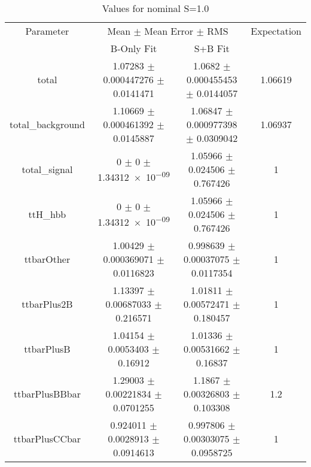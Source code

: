 \begin{table}
\centering
\caption{Values for nominal S=1.0}
\begin{tabular}{cccc}
\toprule
Parameter & \multicolumn{2}{c}{Mean $\pm$ Mean Error $\pm$ RMS} & Expectation\\
 & B-Only Fit & S+B Fit & \\
\midrule
total & \num{1.07283} $\pm$ \num{0.000447276} $\pm$ \num{0.0141471} & \num{1.0682} $\pm$ \num{0.000455453} $\pm$ \num{0.0144057} & \num{1.06619}\\
total\_background & \num{1.10669} $\pm$ \num{0.000461392} $\pm$ \num{0.0145887} & \num{1.06847} $\pm$ \num{0.000977398} $\pm$ \num{0.0309042} & \num{1.06937}\\
total\_signal & \num{0} $\pm$ \num{0} $\pm$ \num{1.34312e-09} & \num{1.05966} $\pm$ \num{0.024506} $\pm$ \num{0.767426} & \num{1}\\
ttH\_hbb & \num{0} $\pm$ \num{0} $\pm$ \num{1.34312e-09} & \num{1.05966} $\pm$ \num{0.024506} $\pm$ \num{0.767426} & \num{1}\\
ttbarOther & \num{1.00429} $\pm$ \num{0.000369071} $\pm$ \num{0.0116823} & \num{0.998639} $\pm$ \num{0.00037075} $\pm$ \num{0.0117354} & \num{1}\\
ttbarPlus2B & \num{1.13397} $\pm$ \num{0.00687033} $\pm$ \num{0.216571} & \num{1.01811} $\pm$ \num{0.00572471} $\pm$ \num{0.180457} & \num{1}\\
ttbarPlusB & \num{1.04154} $\pm$ \num{0.0053403} $\pm$ \num{0.16912} & \num{1.01336} $\pm$ \num{0.00531662} $\pm$ \num{0.16837} & \num{1}\\
ttbarPlusBBbar & \num{1.29003} $\pm$ \num{0.00221834} $\pm$ \num{0.0701255} & \num{1.1867} $\pm$ \num{0.00326803} $\pm$ \num{0.103308} & \num{1.2}\\
ttbarPlusCCbar & \num{0.924011} $\pm$ \num{0.0028913} $\pm$ \num{0.0914613} & \num{0.997806} $\pm$ \num{0.00303075} $\pm$ \num{0.0958725} & \num{1}\\
\bottomrule
\end{tabular}
\end{table}